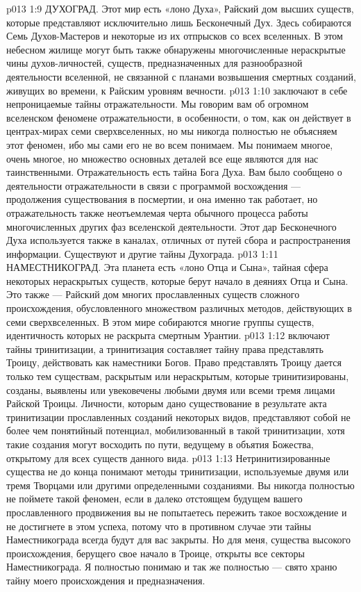 \vs p013 1:9 \bibnobreakspace ДУХОГРАД. Этот мир есть «лоно Духа», Райский дом высших существ, которые представляют исключительно лишь Бесконечный Дух. Здесь собираются Семь Духов\hyp{}Мастеров и некоторые из их отпрысков со всех вселенных. В этом небесном жилище могут быть также обнаружены многочисленные нераскрытые чины духов\hyp{}личностей, существ, предназначенных для разнообразной деятельности вселенной, не связанной с планами возвышения смертных созданий, живущих во времени, к Райским уровням вечности.
\vs p013 1:10 \pc {} заключают в себе непроницаемые тайны отражательности. Мы говорим вам об огромном вселенском феномене отражательности, в особенности, о том, как он действует в центрах\hyp{}мирах семи сверхвселенных, но мы никогда полностью не объясняем этот феномен, ибо мы сами его не во всем понимаем. Мы понимаем многое, очень многое, но множество основных деталей все еще являются для нас таинственными. Отражательность есть тайна Бога Духа. Вам было сообщено о деятельности отражательности в связи с программой восхождения --- продолжения существования в посмертии, и она именно так работает, но отражательность также неотъемлемая черта обычного процесса работы многочисленных других фаз вселенской деятельности. Этот дар Бесконечного Духа используется также в каналах, отличных от путей сбора и распространения информации. Существуют и другие тайны Духограда.
\vs p013 1:11 \bibnobreakspace НАМЕСТНИКОГРАД. Эта планета есть «лоно Отца и Сына», тайная сфера некоторых нераскрытых существ, которые берут начало в деяниях Отца и Сына. Это также --- Райский дом многих прославленных существ сложного происхождения, обусловленного множеством различных методов, действующих в семи сверхвселенных. В этом мире собираются многие группы существ, идентичность которых не раскрыта смертным Урантии.
\vs p013 1:12 \pc {} включают тайны тринитизации, а тринитизация составляет тайну права представлять Троицу, действовать как наместники Богов. Право представлять Троицу дается только тем существам, раскрытым или нераскрытым, которые тринитизированы, созданы, выявлены или увековечены любыми двумя или всеми тремя лицами Райской Троицы. Личности, которым дано существование в результате акта тринитизации прославленных созданий некоторых видов, представляют собой не более чем понятийный потенциал, мобилизованный в такой тринитизации, хотя такие создания могут восходить по пути, ведущему в объятия Божества, открытому для всех существ данного вида.
\vs p013 1:13 Нетринитизированные существа не до конца понимают методы тринитизации, используемые двумя или тремя Творцами или другими определенными созданиями. Вы никогда полностью не поймете такой феномен, если в далеко отстоящем будущем вашего прославленного продвижения вы не попытаетесь пережить такое восхождение и не достигнете в этом успеха, потому что в противном случае эти тайны Наместникограда всегда будут для вас закрыты. Но для меня, существа высокого происхождения, берущего свое начало в Троице, открыты все секторы Наместникограда. Я полностью понимаю и так же полностью --- свято храню тайну моего происхождения и предназначения.
